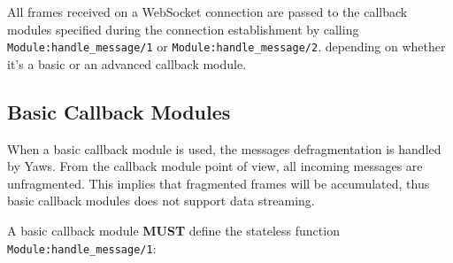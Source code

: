\documentclass[11pt,oneside,english]{book}
\newcommand{\Yaws}            %
        {{\sc Yaws}}
\begin{document}
All frames received on a WebSocket connection are passed to the callback
modules specified during the connection establishment by calling
\verb+Module:handle_message/1+ or \verb+Module:handle_message/2+.
depending on whether it's a basic or an advanced callback module.


\subsection{Basic Callback Modules}
\label{basic-callback-modules}

When a basic callback module is used, the messages defragmentation is handled by
\Yaws. From the callback module point of view, all incoming messages are
unfragmented. This implies that fragmented frames will be accumulated, thus
basic callback modules does not support data streaming.

A basic callback module \textbf{MUST} define the stateless function
\verb+Module:handle_message/1+:
\end{document}
